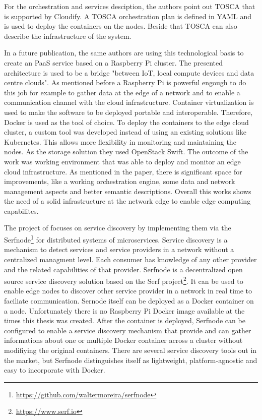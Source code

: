 For the orchestration and services desciption, the authors point out \ac{TOSCA} that is supported by Cloudify.
A \ac{TOSCA} orchestration plan is defined in \ac{YAML} and is used to deploy the containers on the nodes.
Beside that \ac{TOSCA} can also describe the infrastructure of the system.

In a future publication, the same authors are using this technological basis to create an \ac{PaaS} service based on a Raspberry Pi cluster\autocite{Pahl:2016}.
The presented architecture is used to be a bridge "between IoT, local compute devices and data centre clouds"\autocite[p. 117]{Pahl:2016}.
As mentioned before a Raspberry Pi is powerful engough to do this job for example to gather data at the edge of a network and to enable a communication channel with the cloud infrastructure.\autocite[cf.][p. 117]{Pahl:2016}
Container virtualization is used to make the software to be deployed portable and interoperable.\autocite[cf.][p. 117]{Pahl:2016}
Therefore, Docker is used as the tool of choice.
To deploy the containers to the edge cloud cluster, a custom tool was developed instead of using an existing solutions like Kubernetes.\autocite[cf.][p. 122]{Pahl:2016}
This allows more flexibility in monitoring and maintaining the nodes.\autocite[cf.][p. 122]{Pahl:2016}
As the storage solution they used OpenStack Swift.
The outcome of the work was working environment that was able to deploy and monitor an edge cloud infrastructure.
As mentioned in the paper, there is significant space for improvements, like a working orchestration engine, some data and network management aspects and better semantic descriptions.
Overall this works shows the need of a solid infrastructure at the network edge to enable edge computing capabilites.

The project of \autocite{Stubbs:2015} focuses on service discovery by implementing them via the Serfnode\footnote{\url{https://github.com/waltermoreira/serfnode}} for distributed systems of microservices.
Service discovery is a mechanism to detect services and service providers in a network without a centralized managment level.
Each consumer has knowledge of any other provider and the related capabilities of that provider.
Serfnode is a decentralized open source service discovery solution based on the Serf project\footnote{\url{https://www.serf.io}}.
It can be used to enable edge nodes to discover other service provider in a network in real time to faciliate communication.\autocite[cf.][p. 34]{Stubbs:2015}
Sernode itself can be deployed as a Docker container on a node.
Unfortunately there is no Raspberry Pi Docker image available at the times this thesis was created.
After the container is deployed, Serfnode can be configured to enable a service discovery mechanism that provide and can gather informations about one or multiple Docker container across a cluster without modifiying the original containers.\autocite[cf.][p. 34]{Stubbs:2015}
There are several service discovery tools out in the market, but Serfnode distinguishes itself as lightweight, platform-agnostic and easy to incorporate with Docker.\autocite[cf.][p. 34]{Stubbs:2015}

